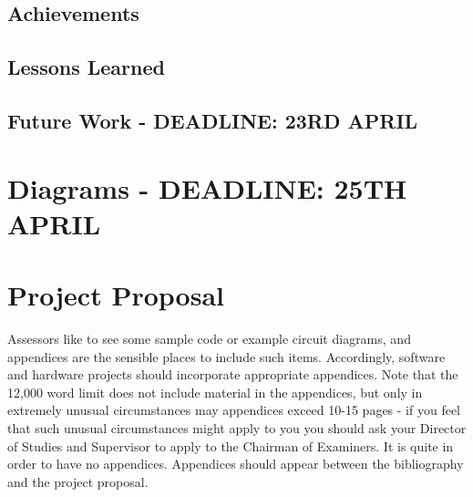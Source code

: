 \documentclass[12pt,a4paper,twoside,openright]{report}
\begin{document}
\section{Achievements}

\section{Lessons Learned}

\section{Future Work - DEADLINE: 23RD APRIL}

\chapter{Diagrams - DEADLINE: 25TH APRIL}
\begin{comment}
This chapter is likely to be very short and it may well refer back to the Introduction. It might properly explain how you would have planned the project if starting again with the benefit of hindsight.
\end{comment}






\appendix

\chapter{Project Proposal}
\label{sec:proposal}
Assessors like to see some sample code or example circuit diagrams, and appendices are the sensible places to include such items. Accordingly, software and hardware projects should incorporate appropriate appendices. Note that the 12,000 word limit does not include material in the appendices, but only in extremely unusual circumstances may appendices exceed 10-15 pages - if you feel that such unusual circumstances might apply to you you should ask your Director of Studies and Supervisor to apply to the Chairman of Examiners. It is quite in order to have no appendices. Appendices should appear between the bibliography and the project proposal.

\end{document}
